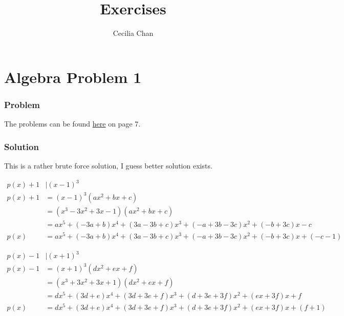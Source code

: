 \documentclass{article}
\title{Exercises}
\author{Cecilia Chan}
\begin{document}
\maketitle

\section*{Algebra Problem 1}
\subsubsection*{Problem}
The problems can be found \href{https://www.math.hkust.edu.hk/~makyli/190_2010Sp/problemBk.pdf}{here} on page 7.

\subsubsection*{Solution}
This is a rather brute force solution, I guess better solution exists.

\begin{align*}
  p(x) + 1 &| (x - 1)^3                                                                           \\
  p(x) + 1 &= (x - 1)^3(ax^2 + bx + c)                                                            \\
           &= (x^3 - 3x^2 + 3x - 1)(ax^2 + bx + c)                                                \\
           &= ax^5 + (-3a + b)x^4 + (3a - 3b + c)x^3 + (-a + 3b - 3c)x^2 + (-b + 3c)x - c        \\
      p(x) &= ax^5 + (-3a + b)x^4 + (3a - 3b + c)x^3 + (-a + 3b - 3c)x^2 + (-b + 3c)x + (-c - 1)
\end{align*}

\begin{align*}
  p(x) - 1 &| (x + 1)^3                                                                       \\
  p(x) - 1 &= (x + 1)^3(dx^2 + ex + f)                                                        \\
           &= (x^3 + 3x^2 + 3x + 1)(dx^2 + ex + f)                                            \\
           &= dx^5 + (3d + e)x^4 + (3d + 3e + f)x^3 + (d + 3e + 3f)x^2 + (ex + 3f)x + f       \\
      p(x) &= dx^5 + (3d + e)x^4 + (3d + 3e + f)x^3 + (d + 3e + 3f)x^2 + (ex + 3f)x + (f + 1) \\
\end{align*}
\end{document}
